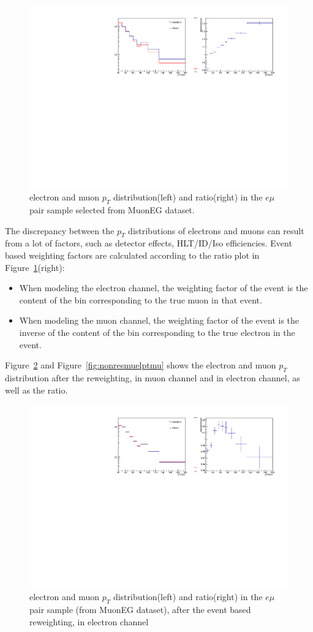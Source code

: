 \begin{figure}[htbp]
\begin{center}
\includegraphics[width=0.72\linewidth]{figures/nonresmuelpt.pdf}
\caption{electron and muon $p_T$ distribution(left) and ratio(right) in the $e\mu$ pair sample selected from MuonEG dataset.}
\label{fig:nonresmuelpt}
\end{center}
\end{figure}

\vspace{0.3cm}
The discrepancy between the $p_T$ distributions of electrons and muons can result from a lot of factors, such as detector effects, HLT/ID/Iso efficiencies. Event based weighting factors are calculated according to the ratio plot in Figure~\ref{fig:nonresmuelpt}(right):
\begin{itemize}
\item  When modeling the electron channel, the weighting factor of the event is the content of the bin corresponding to the true muon in that event. 
\item  When modeling the muon channel, the weighting factor of the event is the inverse of the content of the bin corresponding to the true electron in the event. 
\end{itemize}
Figure~\ref{fig:nonresmuelptel} and Figure~\ref{fig:nonresmuelptmu} shows the electron and muon $p_T$ distribution after the reweighting, in muon channel and in electron channel, as well as the ratio.

\begin{figure}[htbp]
\begin{center}
\includegraphics[width=0.72\linewidth]{figures/nonresmuelptel.pdf}
\caption{electron and muon $p_T$ distribution(left) and ratio(right) in the $e\mu$ pair sample (from MuonEG dataset), after the event based reweighting, in electron channel}
\label{fig:nonresmuelptel}
\end{center}
\end{figure}

